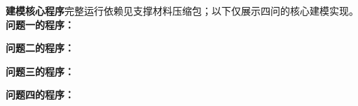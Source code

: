 \clearpage
\noindent\textbf{建模核心程序}\quad 完整运行依赖见支撑材料压缩包；以下仅展示四问的核心建模实现。
\noindent\textbf{问题一的程序：}

\noindent\textbf{问题二的程序：}

\noindent\textbf{问题三的程序：}

\noindent\textbf{问题四的程序：}

